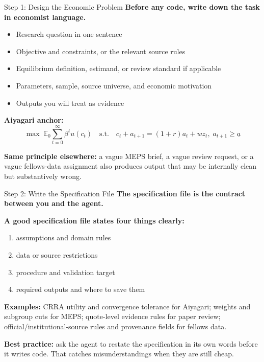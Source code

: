 \documentclass[10pt,english,aspectratio=169]{beamer}
\begin{document}
\begin{frame}{Step 1: Design the Economic Problem}
\textbf{Before any code, write down the task in economist language.}

\vspace{0.25cm}

\begin{itemize}
    \item Research question in one sentence
    \item Objective and constraints, or the relevant source rules
    \item Equilibrium definition, estimand, or review standard if applicable
    \item Parameters, sample, source universe, and economic motivation
    \item Outputs you will treat as evidence
\end{itemize}

\vspace{0.25cm}

\textbf{Aiyagari anchor:}
\[
\max \; \mathbb{E}_0 \sum_{t=0}^{\infty} \beta^t u(c_t)
\quad \text{s.t.} \quad
c_t + a_{t+1} = (1+r)a_t + wz_t,\; a_{t+1} \geq \underline{a}
\]

\vspace{0.15cm}

\textbf{Same principle elsewhere:} a vague MEPS brief, a vague review request, or a vague fellows-data assignment also produces output that may be internally clean but substantively wrong.
\end{frame}

\begin{frame}{Step 2: Write the Specification File}
\textbf{The specification file is the contract between you and the agent.}

\vspace{0.2cm}

\textbf{A good specification file states four things clearly:}
\begin{enumerate}
    \item assumptions and domain rules
    \item data or source restrictions
    \item procedure and validation target
    \item required outputs and where to save them
\end{enumerate}

\vspace{0.25cm}

\textbf{Examples:} CRRA utility and convergence tolerance for Aiyagari; weights and subgroup cuts for MEPS; quote-level evidence rules for paper review; official/institutional-source rules and provenance fields for fellows data.

\vspace{0.18cm}
\textbf{Best practice:} ask the agent to restate the specification in its own words before it writes code. That catches misunderstandings when they are still cheap.
\end{frame}
\end{document}
